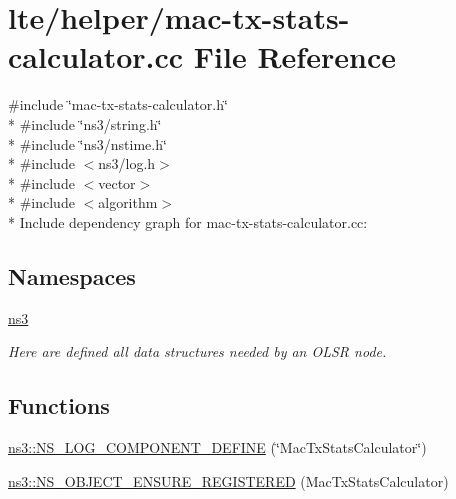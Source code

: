 \hypertarget{mac-tx-stats-calculator_8cc}{}\section{lte/helper/mac-\/tx-\/stats-\/calculator.cc File Reference}
\label{mac-tx-stats-calculator_8cc}
{\ttfamily \#include \char`\"{}mac-\/tx-\/stats-\/calculator.\+h\char`\"{}}\\*
{\ttfamily \#include \char`\"{}ns3/string.\+h\char`\"{}}\\*
{\ttfamily \#include \char`\"{}ns3/nstime.\+h\char`\"{}}\\*
{\ttfamily \#include $<$ns3/log.\+h$>$}\\*
{\ttfamily \#include $<$vector$>$}\\*
{\ttfamily \#include $<$algorithm$>$}\\*
Include dependency graph for mac-\/tx-\/stats-\/calculator.cc\+:
\subsection*{Namespaces}
\begin{DoxyCompactItemize}
\item 
 \hyperlink{namespacens3}{ns3}
\begin{DoxyCompactList}\small\item\em Here are defined all data structures needed by an O\+L\+SR node. \end{DoxyCompactList}\end{DoxyCompactItemize}
\subsection*{Functions}
\begin{DoxyCompactItemize}
\item 
\hyperlink{namespacens3_aba8432f0aae6bcd7c13c58a676365d89}{ns3\+::\+N\+S\+\_\+\+L\+O\+G\+\_\+\+C\+O\+M\+P\+O\+N\+E\+N\+T\+\_\+\+D\+E\+F\+I\+NE} (\char`\"{}Mac\+Tx\+Stats\+Calculator\char`\"{})
\item 
\hyperlink{namespacens3_a40c65ae022b2063017961877a7962265}{ns3\+::\+N\+S\+\_\+\+O\+B\+J\+E\+C\+T\+\_\+\+E\+N\+S\+U\+R\+E\+\_\+\+R\+E\+G\+I\+S\+T\+E\+R\+ED} (Mac\+Tx\+Stats\+Calculator)
\end{DoxyCompactItemize}
